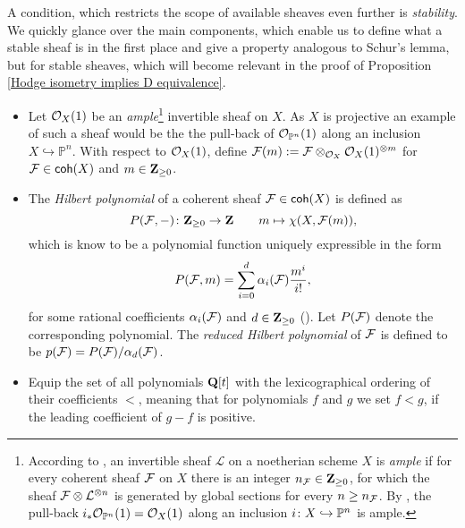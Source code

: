A condition, which restricts the scope of available sheaves even further is \emph{stability}. We quickly glance over the main components, which enable us to define what a stable sheaf is in the first place and give a property analogous to Schur's lemma, but for stable sheaves, which will become relevant in the proof of Proposition \ref{Hodge isometry implies D equivalence}.
\begin{itemize}[label = $\vartriangleright$]
    \item{
        Let ${\mathcal{O}_{X}}(1)$ be an \emph{ample}\footnote{
            According to \cite[\S II.7]{Hartshorne1977}, an invertible sheaf $\mathcal L$ on a noetherian scheme $X$ is \emph{ample} if for every coherent sheaf $\mathcal F$ on $X$ there is an integer $n_\mathcal F \in \mathbf Z_{\geq 0}$, for which the sheaf $\mathcal F \otimes \mathcal L^{\otimes n}$ is generated by global sections for every $n \geq n_\mathcal F$. By \cite[\S II, Example 7.6.1]{Hartshorne1977}, the pull-back $i_*{\mathcal{O}_{\mathbb P^n}}(1) = {\mathcal{O}_{X}}(1)$ along an inclusion $i \colon X \hookrightarrow \mathbb P^n$ is ample. 
        } invertible sheaf on $X$. As $X$ is projective an example of such a sheaf would be the the pull-back of ${\mathcal{O}_{\mathbb P^n}}(1)$ along an inclusion $X \hookrightarrow \mathbb{P}^n$. With respect to ${\mathcal{O}_{X}}(1)$, define 
        $\mathcal F(m) := \mathcal F \otimes_{{\mathcal{O}_{X}}} {\mathcal{O}_{X}}(1)^{\otimes m}$ for $\mathcal F \in \mathsf{coh}(X)$ and $m \in \mathbf Z_{\geq 0}$.
        }
    \item{
        The \emph{Hilbert polynomial} of a coherent sheaf $\mathcal F \in \mathsf{coh}(X)$ is defined as
        \[
            P(\mathcal F, -) \colon \mathbf Z_{\geq 0} \to \mathbf Z \qquad m \mapsto \chi(X, \mathcal F(m)),
        \]
        which is know to be a polynomial function uniquely expressible in the form 
        \[
            P(\mathcal F, m) = \sum_{i = 0}^d \alpha_i(\mathcal F)\frac{m^i}{i!},
        \]
        for some rational coefficients $\alpha_i(\mathcal F)$ and $d \in \mathbf Z_{\geq 0}$ (\cf \cite[\S I.1.2, Lemma 1.2.1]{HuybrechtsLehn2010}). Let $P(\mathcal F)$ denote the corresponding polynomial. The \emph{reduced Hilbert polynomial} of $\mathcal F$ is defined to be $p(\mathcal F) = P(\mathcal F)/\alpha_d(\mathcal F)$. 
    }
    \item{
        Equip the set of all polynomials $\mathbf Q[t]$ with the lexicographical ordering of their coefficients $<$, meaning that for polynomials $f$ and $g$ we set $f < g$, if the leading coefficient of $g - f$ is positive. 
}
\end{itemize}
